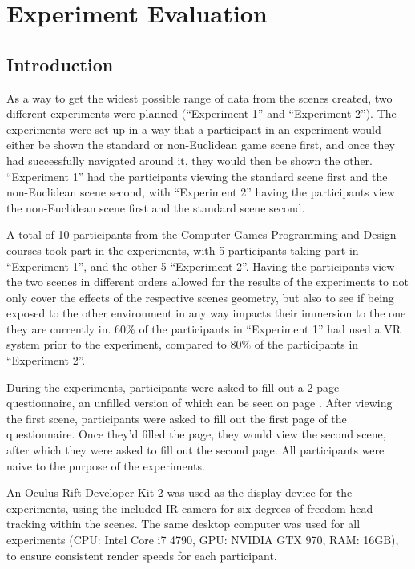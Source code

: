 \chapter[Experiment]{Experiment Evaluation}
\label{exp}

	\section{Introduction}
	\label{exp:intro}

		As a way to get the widest possible range of data from the scenes created, two different experiments were planned (\enquote{Experiment 1} and \enquote{Experiment 2}).
		The experiments were set up in a way that a participant in an experiment would either be shown the standard or non-Euclidean game scene first, and once they had successfully navigated around it, they would then be shown the other.
		\enquote{Experiment 1} had the participants viewing the standard scene first and the non-Euclidean scene second, with \enquote{Experiment 2} having the participants view the non-Euclidean scene first and the standard scene second.

		A total of 10 participants from the Computer Games Programming and Design courses took part in the experiments, with 5 participants taking part in \enquote{Experiment 1}, and the other 5 \enquote{Experiment 2}.
		Having the participants view the two scenes in different orders allowed for the results of the experiments to not only cover the effects of the respective scenes geometry, but also to see if being exposed to the other environment in any way impacts their immersion to the one they are currently in. %
		$60\%$ of the participants in \enquote{Experiment 1} had used a VR system prior to the experiment, compared to $80\%$ of the participants in \enquote{Experiment 2}.

		During the experiments, participants were asked to fill out a 2 page questionnaire, an unfilled version of which can be seen on page \pageref{appendix:question}.
		After viewing the first scene, participants were asked to fill out the first page of the questionnaire. Once they'd filled the page, they would view the second scene, after which they were asked to fill out the second page. %
		All participants were naive to the purpose of the experiments.

		An Oculus Rift Developer Kit 2 was used as the display device for the experiments, using the included IR camera for six degrees of freedom head tracking within the scenes.
		The same desktop computer was used for all experiments (CPU: Intel Core i7 4790, GPU: NVIDIA GTX 970, RAM: 16GB), to ensure consistent render speeds for each participant.

